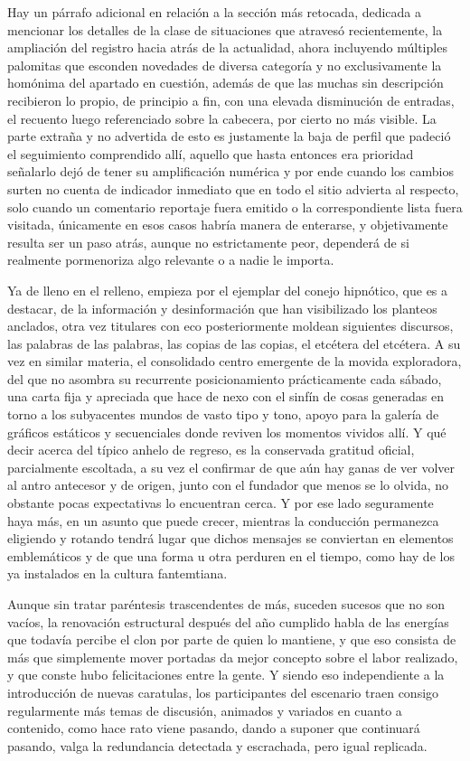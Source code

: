 \documentclass[
]{book}
\begin{document}
Hay un párrafo adicional en relación a la sección más retocada, dedicada a mencionar los detalles de la clase de situaciones que atravesó recientemente, la ampliación del registro hacia atrás de la actualidad, ahora incluyendo múltiples palomitas que esconden novedades de diversa categoría y no exclusivamente la homónima del apartado en cuestión, además de que las muchas sin descripción recibieron lo propio, de principio a fin, con una elevada disminución de entradas, el recuento luego referenciado sobre la cabecera, por cierto no más visible. La parte extraña y no advertida de esto es justamente la baja de perfil que padeció el seguimiento comprendido allí, aquello que hasta entonces era prioridad señalarlo dejó de tener su amplificación numérica y por ende cuando los cambios surten no cuenta de indicador inmediato que en todo el sitio advierta al respecto, solo cuando un comentario reportaje fuera emitido o la correspondiente lista fuera visitada, únicamente en esos casos habría manera de enterarse, y objetivamente resulta ser un paso atrás, aunque no estrictamente peor, dependerá de si realmente pormenoriza algo relevante o a nadie le importa.

Ya de lleno en el relleno, empieza por el ejemplar del conejo hipnótico, que es a destacar, de la información y desinformación que han visibilizado los planteos anclados, otra vez titulares con eco posteriormente moldean siguientes discursos, las palabras de las palabras, las copias de las copias, el etcétera del etcétera. A su vez en similar materia, el consolidado centro emergente de la movida exploradora, del que no asombra su recurrente posicionamiento prácticamente cada sábado, una carta fija y apreciada que hace de nexo con el sinfín de cosas generadas en torno a los subyacentes mundos de vasto tipo y tono, apoyo para la galería de gráficos estáticos y secuenciales donde reviven los momentos vividos allí. Y qué decir acerca del típico anhelo de regreso, es la conservada gratitud oficial, parcialmente escoltada, a su vez el confirmar de que aún hay ganas de ver volver al antro antecesor y de origen, junto con el fundador que menos se lo olvida, no obstante pocas expectativas lo encuentran cerca. Y por ese lado seguramente haya más, en un asunto que puede crecer, mientras la conducción permanezca eligiendo y rotando tendrá lugar que dichos mensajes se conviertan en elementos emblemáticos y de que una forma u otra perduren en el tiempo, como hay de los ya instalados en la cultura fantemtiana.

Aunque sin tratar paréntesis trascendentes de más, suceden sucesos que no son vacíos, la renovación estructural después del año cumplido habla de las energías que todavía percibe el clon por parte de quien lo mantiene, y que eso consista de más que simplemente mover portadas da mejor concepto sobre el labor realizado, y que conste hubo felicitaciones entre la gente. Y siendo eso independiente a la introducción de nuevas caratulas, los participantes del escenario traen consigo regularmente más temas de discusión, animados y variados en cuanto a contenido, como hace rato viene pasando, dando a suponer que continuará pasando, valga la redundancia detectada y escrachada, pero igual replicada.
\end{document}

